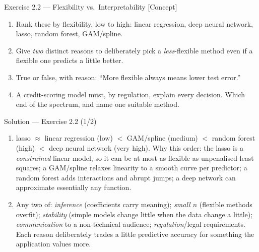 \documentclass[aspectratio=169,11pt]{beamer}
\begin{document}
\begin{frame}{Exercise 2.2 --- Flexibility vs.\ Interpretability [Concept]}
\begin{exercise}
\begin{enumerate}
  \item Rank these by flexibility, low to high: linear regression,
        deep neural network, lasso, random forest, GAM/spline.
  \item Give \emph{two} distinct reasons to deliberately pick a
        \emph{less}-flexible method even if a flexible one predicts a
        little better.
  \item True or false, with reason: ``More flexible always means
        lower test error.''
  \item A credit-scoring model must, by regulation, explain every
        decision. Which end of the spectrum, and name one suitable
        method.
\end{enumerate}
\end{exercise}
\end{frame}

\begin{frame}{Solution --- Exercise 2.2 (1/2)}
\begin{solutionbox}
\begin{enumerate}
  \item lasso $\approx$ linear regression (low) $<$ GAM/spline
        (medium) $<$ random forest (high) $<$ deep neural network
        (very high). Why this order: the lasso is a
        \emph{constrained} linear model, so it can be at most as
        flexible as unpenalised least squares; a GAM/spline relaxes
        linearity to a smooth curve per predictor; a random forest
        adds interactions and abrupt jumps; a deep network can
        approximate essentially any function.
  \item Any two of: \emph{inference} (coefficients carry meaning);
        \emph{small $n$} (flexible methods overfit); \emph{stability}
        (simple models change little when the data change a little);
        \emph{communication} to a non-technical audience;
        \emph{regulation}/legal requirements. Each reason deliberately
        trades a little predictive accuracy for something the
        application values more.
\end{enumerate}
\end{solutionbox}
\end{frame}
\end{document}

